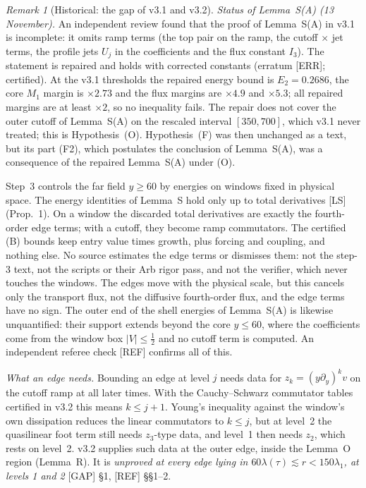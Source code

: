 \documentclass[11pt]{amsart}
\theoremstyle{definition}
\theoremstyle{remark}
\newtheorem{remark}[theorem]{Remark}
\newcommand{\dref}[1]{[\textsf{#1}]}
\begin{document}
\begin{remark}[Historical: the gap of v3.1 and v3.2]
\emph{Status of Lemma~S(A) (13 November).} An independent review found that the proof of Lemma~S(A) in v3.1 is incomplete: it omits ramp terms (the top pair on the ramp, the cutoff $\times$ jet terms, the profile jets $U_j$ in the coefficients and the flux constant $I_3$). The statement is repaired and holds with corrected constants (erratum \dref{ERR}; certified). At the v3.1 thresholds the repaired energy bound is $E_2=0.2686$, the core $M_1$ margin is $\times2.73$ and the flux margins are $\times4.9$ and $\times5.3$; all repaired margins are at least $\times2$, so no inequality fails. The repair does not cover the outer cutoff of Lemma~S(A) on the rescaled interval $[350,700]$, which v3.1 never treated; this is Hypothesis~(O). Hypothesis~(F) was then unchanged as a text, but its part (F2), which postulates the conclusion of Lemma~S(A), was a consequence of the repaired Lemma~S(A) under (O).


Step~3 controls the far field $y\ge60$ by energies on windows fixed in physical space. The energy identities of Lemma~S hold only up to total derivatives \dref{LS} (Prop.~1). On a window the discarded total derivatives are exactly the fourth-order edge terms; with a cutoff, they become ramp commutators. The certified (B) bounds keep entry value times growth, plus forcing and coupling, and nothing else. No source estimates the edge terms or dismisses them: not the step-3 text, not the scripts or their Arb rigor pass, and not the verifier, which never touches the windows. The edges move with the physical scale, but this cancels only the transport flux, not the diffusive fourth-order flux, and the edge terms have no sign. The outer end of the shell energies of Lemma~S(A) is likewise unquantified: their support extends beyond the core $y\le60$, where the coefficients come from the window box $|V|\le\frac12$ and no cutoff term is computed. An independent referee check \dref{REF} confirms all of this.

\emph{What an edge needs.} Bounding an edge at level $j$ needs data for $z_k=(y\partial_y)^kv$ on the cutoff ramp at all later times. With the Cauchy--Schwarz commutator tables certified in v3.2 this means $k\le j+1$. Young's inequality against the window's own dissipation reduces the linear commutators to $k\le j$, but at level~2 the quasilinear foot term still needs $z_3$-type data, and level~1 then needs $z_2$, which rests on level~2. v3.2 supplies such data at the outer edge, inside the Lemma~O region (Lemma~R). It is \emph{unproved at every edge lying in $60\lambda(\tau)\lesssim r<150\lambda_1$, at levels 1 and 2} \dref{GAP} \S1, \dref{REF} \S\S1--2.


\end{remark}
\end{document}
